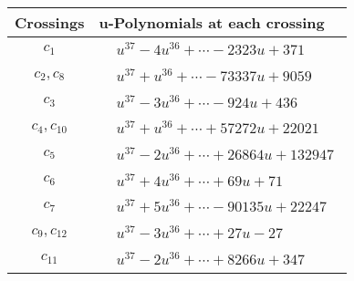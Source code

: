 \documentclass[1p]{elsarticle_modified}
\theoremstyle{definition}
\begin{document}
\begin{tabular}{m{50pt}|m{274pt}}
Crossings & \hspace{64pt}u-Polynomials at each crossing \\
\hline $$\begin{aligned}c_{1}\end{aligned}$$&$\begin{aligned}
&u^{37}-4 u^{36}+\cdots-2323 u+371
\end{aligned}$\\
\hline $$\begin{aligned}c_{2},c_{8}\end{aligned}$$&$\begin{aligned}
&u^{37}+u^{36}+\cdots-73337 u+9059
\end{aligned}$\\
\hline $$\begin{aligned}c_{3}\end{aligned}$$&$\begin{aligned}
&u^{37}-3 u^{36}+\cdots-924 u+436
\end{aligned}$\\
\hline $$\begin{aligned}c_{4},c_{10}\end{aligned}$$&$\begin{aligned}
&u^{37}+u^{36}+\cdots+57272 u+22021
\end{aligned}$\\
\hline $$\begin{aligned}c_{5}\end{aligned}$$&$\begin{aligned}
&u^{37}-2 u^{36}+\cdots+26864 u+132947
\end{aligned}$\\
\hline $$\begin{aligned}c_{6}\end{aligned}$$&$\begin{aligned}
&u^{37}+4 u^{36}+\cdots+69 u+71
\end{aligned}$\\
\hline $$\begin{aligned}c_{7}\end{aligned}$$&$\begin{aligned}
&u^{37}+5 u^{36}+\cdots-90135 u+22247
\end{aligned}$\\
\hline $$\begin{aligned}c_{9},c_{12}\end{aligned}$$&$\begin{aligned}
&u^{37}-3 u^{36}+\cdots+27 u-27
\end{aligned}$\\
\hline $$\begin{aligned}c_{11}\end{aligned}$$&$\begin{aligned}
&u^{37}-2 u^{36}+\cdots+8266 u+347
\end{aligned}$\\
\hline
\end{tabular}\\~\\
\end{document}
